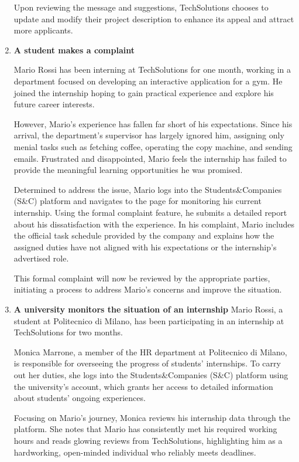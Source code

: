 \begin{enumerate}
    Upon reviewing the message and suggestions, TechSolutions chooses to update and modify their project description to enhance its appeal and attract more applicants.
    
    \item \textbf{A student makes a complaint}

    Mario Rossi has been interning at TechSolutions for one month, working in a department focused on developing an interactive application for a gym. He joined the internship hoping to gain practical experience and explore his future career interests.

    However, Mario’s experience has fallen far short of his expectations. Since his arrival, the department’s supervisor has largely ignored him, assigning only menial tasks such as fetching coffee, operating the copy machine, and sending emails. Frustrated and disappointed, Mario feels the internship has failed to provide the meaningful learning opportunities he was promised.

    Determined to address the issue, Mario logs into the Students\&Companies (S\&C) platform and navigates to the page for monitoring his current internship. Using the formal complaint feature, he submits a detailed report about his dissatisfaction with the experience. In his complaint, Mario includes the official task schedule provided by the company and explains how the assigned duties have not aligned with his expectations or the internship’s advertised role.

    This formal complaint will now be reviewed by the appropriate parties, initiating a process to address Mario’s concerns and improve the situation.


    \item \textbf{A university monitors the situation of an internship}
    Mario Rossi, a student at Politecnico di Milano, has been participating in an internship at TechSolutions for two months.

    Monica Marrone, a member of the HR department at Politecnico di Milano, is responsible for overseeing the progress of students' internships. To carry out her duties, she logs into the Students\&Companies (S\&C) platform using the university's account, which grants her access to detailed information about students’ ongoing experiences.

    Focusing on Mario’s journey, Monica reviews his internship data through the platform. She notes that Mario has consistently met his required working hours and reads glowing reviews from TechSolutions, highlighting him as a hardworking, open-minded individual who reliably meets deadlines.


\end{enumerate}

